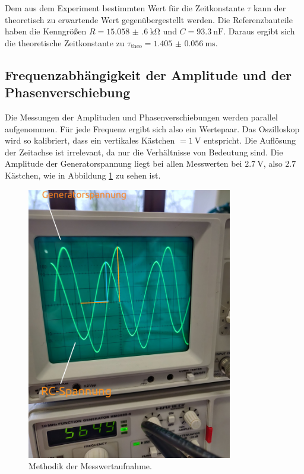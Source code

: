 Dem aus dem Experiment bestimmten Wert für die Zeitkonstante $\tau$ kann der theoretisch zu erwartende Wert gegenübergestellt werden. 
Die Referenzbauteile haben die Kenngrößen ${R=\SI{15.058(600)}{\kilo\ohm}}$ und ${C=\SI{93.3}{\nano\farad}}$. 
Daraus ergibt sich die theoretische Zeitkonstante zu $\tau _\text{theo}=\SI{1.405(56)}{\milli\second}$.

\FloatBarrier

\subsection{Frequenzabhängigkeit der Amplitude und der Phasenverschiebung}
 

Die Messungen der Amplituden und Phasenverschiebungen werden parallel aufgenommen. Für jede Frequenz ergibt sich also ein Wertepaar.
Das Oszilloskop wird so kalibriert, dass ein vertikales Kästchen $= \SI{1}{\volt}$ entspricht. Die Auflösung der Zeitachse ist irrelevant, da nur die Verhältnisse von Bedeutung sind.
Die Amplitude der Generatorspannung liegt bei allen Messwerten bei $\SI{2.7}{\volt}$, also $2.7$ Kästchen, wie in Abbildung \ref{fig:methodik} zu sehen ist.

\begin{figure}
    \centering
    \includegraphics[width=0.8\textwidth]{plots/beispiel_Messung.jpg}
    \caption{Methodik der Messwertaufnahme.}
    \label{fig:methodik}
\end{figure}

